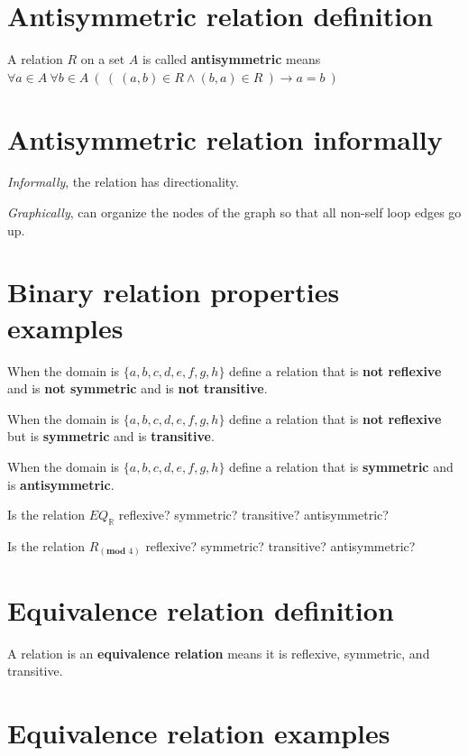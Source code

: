 \documentclass[12pt, oneside]{article}
\begin{document}
\section*{Antisymmetric relation definition}


A relation $R$ on a set $A$ is called {\bf antisymmetric} means 
$\forall a \in A ~\forall b \in A~\left(~\left( ~(a,b) \in R \land (b,a) \in R ~\right) \to a=b~\right)$
 \vfill
\section*{Antisymmetric relation informally}


{\it Informally}, the relation has directionality.

{\it Graphically}, can organize the nodes of the graph so that 
all non-self loop edges go up. \vfill
\section*{Binary relation properties examples}



When the domain is $\{ a,b,c,d,e,f,g,h\}$ define a relation that is {\bf not reflexive} and 
is {\bf not symmetric} and is {\bf not transitive}.

\vfill

When the domain is $\{ a,b,c,d,e,f,g,h\}$ define a relation that is {\bf not reflexive} but 
is {\bf symmetric} and is {\bf transitive}.

\vfill

When the domain is $\{ a,b,c,d,e,f,g,h\}$ define a relation that is {\bf symmetric} and
is {\bf antisymmetric}.

\vfill

Is the relation $EQ_{\mathbb{R}}$ reflexive? symmetric? transitive? antisymmetric?

\vfill

Is the relation $R_{(\textbf{mod } 4)}$ reflexive? symmetric? transitive? antisymmetric?

\vfill
%
 \vfill
\section*{Equivalence relation definition}


A relation is an {\bf equivalence relation} means it is reflexive, symmetric, and transitive. \vfill
\section*{Equivalence relation examples}
\end{document}
